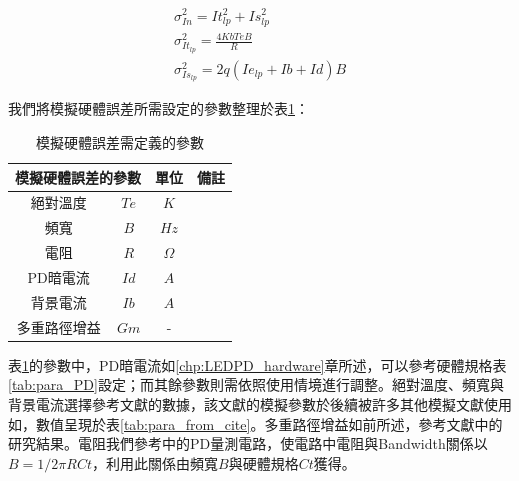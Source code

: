     \begin{gather}
        \label{eqn:var_noise}
        \sigma_{In}^2 = {It_{lp}^2+Is_{lp}^2}\\
        \label{eqn:thermal_noise}
        \sigma_{It_{lp}}^2={\frac{4 Kb Te B}{R}}\\
        \label{eqn:shot_noise}
        \sigma_{Is_{lp}}^2={2q(Ie_{lp}+Ib+Id)B}
    \end{gather}

  

    我們將模擬硬體誤差所需設定的參數整理於表\ref{tab:para_error}：

    \begin{table}[htpb]
        \renewcommand{\arraystretch}{1.3}
        \setlength{\arrayrulewidth}{0.15mm}
        \setlength{\doublerulesep}{0.12mm}
        \caption{模擬硬體誤差需定義的參數}
        \label{tab:para_error}
        \centering
        \begin{tabular}{|cc|c|c|}
        \hline
        \multicolumn{2}{|c|}{\textbf{模擬硬體誤差的參數}}  &\textbf{單位}  &  \textbf{備註}   \\
        \hline
        絕對溫度 &$Te$ & $K$ &  \\
        頻寬 &$B$ & $Hz$ &  \\
        電阻 &$R$ & $\Omega$ &  \\
        PD暗電流 &$Id$ & $A$ &  \\
        背景電流 &$Ib$ & $A$ &  \\
        多重路徑增益 &$Gm$&-&\\
        \hline
        \end{tabular}
    \end{table}


    表\ref{tab:para_error}的參數中，PD暗電流如\ref{chp:LEDPD_hardware}章所述，可以參考硬體規格表\ref{tab:para_PD}設定；而其餘參數則需依照使用情境進行調整。絕對溫度、頻寬與背景電流選擇參考文獻\cite{omg_old}的數據，該文獻的模擬參數於後續被許多其他模擬文獻使用如\cite{omg_new}，數值呈現於表\ref{tab:para_from_cite}。多重路徑增益如前所述，參考文獻\cite{multipath_new}中的研究結果。電阻我們參考\cite{hamamatsu}中的PD量測電路，使電路中電阻與Bandwidth關係以$B = 1/2\pi RCt$，利用此關係由頻寬$B$與硬體規格$Ct$獲得。


